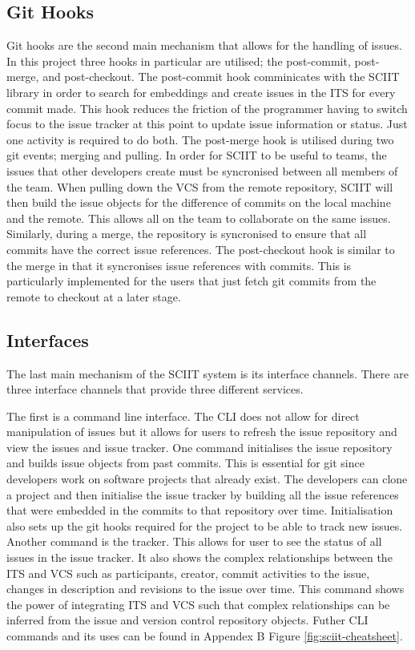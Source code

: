 \documentclass{mproj}
\begin{document}
\subsection{Git Hooks}

Git hooks are the second main mechanism that allows for the handling of issues. In this project three hooks in particular are utilised; the post-commit, post-merge, and post-checkout. The post-commit hook comminicates with the SCIIT library in order to search for embeddings and create issues in the ITS for every commit made. This hook reduces the friction of the programmer having to switch focus to the issue tracker at this point to update issue information or status. Just one activity is required to do both. The post-merge hook is utilised during two git events; merging and pulling. In order for SCIIT to be useful to teams, the issues that other developers create must be syncronised between all members of the team. When pulling down the VCS from the remote repository, SCIIT will then build the issue objects for the difference of commits on the local machine and the remote. This allows all on the team to collaborate on the same issues. Similarly, during a merge, the repository is syncronised to ensure that all commits have the correct issue references. The post-checkout hook is similar to the merge in that it syncronises issue references with commits. This is particularly implemented for the users that just fetch git commits from the remote to checkout at a later stage.

\subsection{Interfaces}

The last main mechanism of the SCIIT system is its interface channels. There are three interface channels that provide three different services. 

The first is a command line interface. The CLI does not allow for direct manipulation of issues but it allows for users to refresh the issue repository and view the issues and issue tracker. One command initialises the issue repository and builds issue objects from past commits. This is essential for git since developers work on software projects that already exist. The developers can clone a project and then initialise the issue tracker by building all the issue references that were embedded in the commits to that repository over time. Initialisation also sets up the git hooks required for the project to be able to track new issues. Another command is the tracker. This allows for user to see the status of all issues in the issue tracker. It also shows the complex relationships between the ITS and VCS such as participants, creator, commit activities to the issue, changes in description and revisions to the issue over time. This command shows the power of integrating ITS and VCS such that complex relationships can be inferred from the issue and version control repository objects. Futher CLI commands and its uses can be found in Appendex B Figure \ref{fig:sciit-cheatsheet}.
\end{document}
